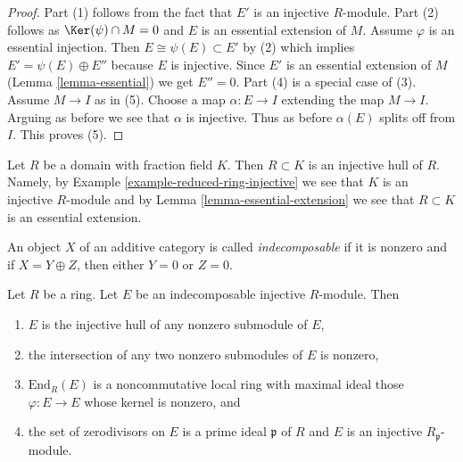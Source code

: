 \begin{proof}
Part (1) follows from the fact that $E'$ is an injective $R$-module.
Part (2) follows as $\Ker(\psi) \cap M = 0$
and $E$ is an essential extension of $M$.
Assume $\varphi$ is an essential injection. Then
$E \cong \psi(E) \subset E'$ by (2) which implies
$E' = \psi(E) \oplus E''$ because $E$ is injective.
Since $E'$ is an essential extension of
$M$ (Lemma \ref{lemma-essential}) we get $E'' = 0$.
Part (4) is a special case of (3).
Assume $M \to I$ as in (5).
Choose a map $\alpha : E \to I$ extending the map $M \to I$.
Arguing as before we see that $\alpha$ is injective.
Thus as before $\alpha(E)$ splits off from $I$.
This proves (5).
\end{proof}

\begin{example}
\label{example-injective-hull-domain}
Let $R$ be a domain with fraction field $K$. Then $R \subset K$ is an
injective hull of $R$. Namely, by
Example \ref{example-reduced-ring-injective} we see that $K$ is an injective
$R$-module and by Lemma \ref{lemma-essential-extension} we see that
$R \subset K$ is an essential extension.
\end{example}

\begin{definition}
\label{definition-indecomposable}
An object $X$ of an additive category is called {\it indecomposable}
if it is nonzero and if $X = Y \oplus Z$, then either $Y = 0$ or $Z = 0$.
\end{definition}

\begin{lemma}
\label{lemma-indecomposable-injective}
Let $R$ be a ring. Let $E$ be an indecomposable injective $R$-module.
Then
\begin{enumerate}
\item $E$ is the injective hull of any nonzero submodule of $E$,
\item the intersection of any two nonzero submodules of $E$ is nonzero,
\item $\text{End}_R(E)$ is a noncommutative local ring with maximal
ideal those $\varphi : E \to E$ whose kernel is nonzero, and
\item the set of zerodivisors on $E$ is a prime ideal $\mathfrak p$ of $R$
and $E$ is an injective $R_\mathfrak p$-module.
\end{enumerate}
\end{lemma}

